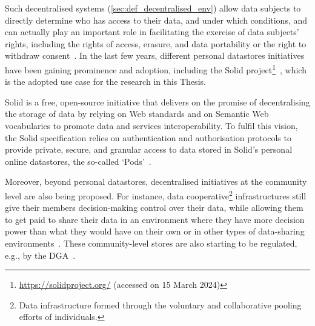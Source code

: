 Such decentralised systems (\ref{sec:def_decentralised_env}) allow data subjects to directly determine who has access to their data, and under which conditions, and can actually play an important role in facilitating the exercise of data subjects’ rights, including the rights of access, erasure, and data portability or the right to withdraw consent~\citep{janssen_personal_2020}.
In the last few years, different personal datastores initiatives have been gaining prominence and adoption, including the Solid project\footnote{\url{https://solidproject.org/} (accessed on 15 March 2024)}~\citep{fallatah_personal_2023}, which is the adopted use case for the research in this Thesis.

Solid is a free, open-source initiative that delivers on the promise of decentralising the storage of data by relying on Web standards and on Semantic Web vocabularies to promote data and services interoperability. To fulfil this vision, the Solid specification relies on authentication and authorisation protocols to provide private, secure, and granular access to data stored in Solid's personal online datastores, the so-called `Pods'~\citep{mansour_demonstration_2016}.

Moreover, beyond personal datastores, decentralised initiatives at the community level are also being proposed.
For instance, data cooperative\footnote{Data infrastructure formed through the voluntary and collaborative pooling efforts of individuals.} infrastructures still give their members decision-making control over their data, while allowing them to get paid to share their data in an environment where they have more decision power than what they would have on their own or in other types of data-sharing environments~\citep{mechant_saving_2021}.
These community-level stores are also starting to be regulated, e.g., by the DGA~\citeyearpar{noauthor_regulation_2022}.